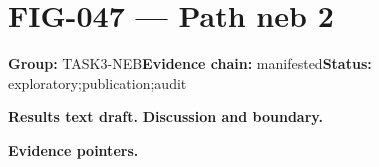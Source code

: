 \clearpage
\section{FIG-047 --- Path neb 2}
\label{figpage:fig-047}
\textbf{Group:} TASK3-NEB\quad \textbf{Evidence chain:} manifested\quad \textbf{Status:} exploratory;publication;audit

\textbf{Results text draft.} 
\textbf{Discussion and boundary.} 


\textbf{Evidence pointers.}



\vfill
